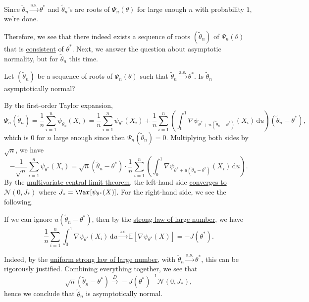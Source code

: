 \begin{answer}
	Since \(\widetilde{\theta} _n \overset{\text{a.s.} }{\to} \theta ^{\ast} \) and \(\widetilde{\theta} _n\)'s are roots of \(\Psi _n(\theta )\) for large enough \(n\) with probability \(1\), we're done.
\end{answer}

Therefore, we see that there indeed exists a sequence of roots \((\widetilde{\theta} _n)\) of \(\Psi _n(\theta )\) that is \hyperref[def:consistent]{consistent} of \(\theta ^{\ast} \). Next, we answer the question about asymptotic normality, but for \(\widetilde{\theta} _n\) this time.

\begin{problem*}
	Let \((\widetilde{\theta} _n)\) be a sequence of roots of \(\Psi _n(\theta )\) such that \(\widetilde{\theta} _n \overset{\text{a.s.} }{\to} \theta ^{\ast} \). Is \(\widetilde{\theta} _n\) asymptotically normal?
\end{problem*}
\begin{answer}
	By the first-order Taylor expansion,
	\[
		\Psi _n(\widetilde{\theta} _n)
		= \frac{1}{n}\sum_{i=1}^{n} \psi _{\widetilde{\theta} _n}(X_i)
		= \frac{1}{n}\sum_{i=1}^{n} \psi _{\theta ^{\ast} }(X_i) + \frac{1}{n}\sum_{i=1}^{n} \left( \int_{0}^{1} \nabla \psi _{\theta ^{\ast} + u (\widetilde{\theta} _n - \theta ^{\ast} )} (X_i) \,\mathrm{d}u \right) (\widetilde{\theta} _n - \theta ^{\ast} ),
	\]
	which is \(0\) for \(n\) large enough since then \(\Psi _n(\widetilde{\theta} _n) = 0\). Multiplying both sides by \(\sqrt{n} \), we have
	\[
		-\frac{1}{\sqrt{n} }\sum_{i=1}^{n} \psi _{\theta ^{\ast} }(X_i)
		= \sqrt{n} (\widetilde{\theta} _n - \theta ^{\ast} ) \cdot \frac{1}{n}\sum_{i=1}^{n} \left( \int_{0}^{1} \nabla \psi _{\theta ^{\ast} + u (\widetilde{\theta} _n - \theta ^{\ast} )} (X_i) \,\mathrm{d}u \right) .
	\]
	By the \hyperref[thm:multivariate-CLT]{multivariate central limit theorem}, the left-hand side \hyperref[def:converge-in-distribution]{converges to} \(\mathcal{N} (0, J_{\ast})\) where \(J_\ast = \Var_{}[\psi _{\theta ^{\ast} }(X)] \). For the right-hand side, we see the following.

	\begin{intuition}
		If we can ignore \(u(\widetilde{\theta} _n - \theta ^{\ast} )\), then by the \hyperref[thm:SLLN]{strong law of large number}, we have
		\[
			\frac{1}{n}\sum_{i=1}^{n} \int_{0}^{1} \nabla \psi _{\theta ^{\ast} }(X_i) \,\mathrm{d}u
			\overset{\text{a.s.} }{\to} \mathbb{E}_{}[\nabla \psi _{\theta ^{\ast} }(X)]
			= - J(\theta ^{\ast} ).
		\]
	\end{intuition}

	Indeed, by the \hyperref[thm:uniform-SLLN]{uniform strong law of large number}, with \(\widetilde{\theta} _n \overset{\text{a.s.} }{\to} \theta ^{\ast} \), this can be rigorously justified. Combining everything together, we see that
	\[
		\sqrt{n} (\widetilde{\theta} _n - \theta ^{\ast} )
		\overset{D}{\to} - J(\theta ^{\ast} )^{-1} \mathcal{N} (0, J_{\ast}),
	\]
	hence we conclude that \(\widetilde{\theta} _n\) is asymptotically normal.
\end{answer}

